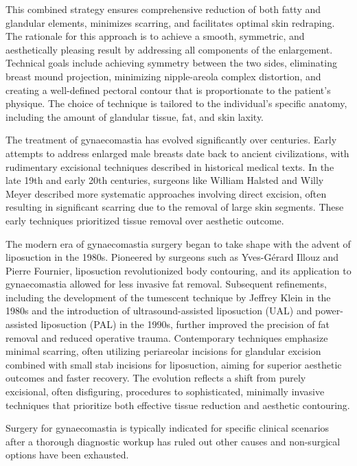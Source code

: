 This combined strategy ensures comprehensive reduction of both fatty and glandular elements, minimizes scarring, and facilitates optimal skin redraping. The rationale for this approach is to achieve a smooth, symmetric, and aesthetically pleasing result by addressing all components of the enlargement. Technical goals include achieving symmetry between the two sides, eliminating breast mound projection, minimizing nipple-areola complex distortion, and creating a well-defined pectoral contour that is proportionate to the patient's physique. The choice of technique is tailored to the individual's specific anatomy, including the amount of glandular tissue, fat, and skin laxity.

The treatment of gynaecomastia has evolved significantly over centuries. Early attempts to address enlarged male breasts date back to ancient civilizations, with rudimentary excisional techniques described in historical medical texts. In the late 19th and early 20th centuries, surgeons like William Halsted and Willy Meyer described more systematic approaches involving direct excision, often resulting in significant scarring due to the removal of large skin segments. These early techniques prioritized tissue removal over aesthetic outcome.

The modern era of gynaecomastia surgery began to take shape with the advent of liposuction in the 1980s. Pioneered by surgeons such as Yves-G\'{e}rard Illouz and Pierre Fournier, liposuction revolutionized body contouring, and its application to gynaecomastia allowed for less invasive fat removal. Subsequent refinements, including the development of the tumescent technique by Jeffrey Klein in the 1980s and the introduction of ultrasound-assisted liposuction (UAL) and power-assisted liposuction (PAL) in the 1990s, further improved the precision of fat removal and reduced operative trauma. Contemporary techniques emphasize minimal scarring, often utilizing periareolar incisions for glandular excision combined with small stab incisions for liposuction, aiming for superior aesthetic outcomes and faster recovery. The evolution reflects a shift from purely excisional, often disfiguring, procedures to sophisticated, minimally invasive techniques that prioritize both effective tissue reduction and aesthetic contouring.

Surgery for gynaecomastia is typically indicated for specific clinical scenarios after a thorough diagnostic workup has ruled out other causes and non-surgical options have been exhausted.

